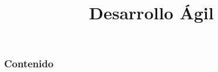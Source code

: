 \documentclass{beamer}
\title{Desarrollo Ágil}  %
\subtitle[]{}
\begin{document}
\begin{frame}
  \titlepage
\end{frame}

\begin{frame}
  \frametitle{Contenido}
  \tableofcontents
\end{frame}





\end{document}
